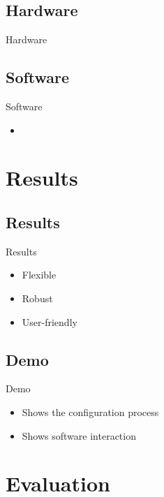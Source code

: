 \documentclass[t]{beamer}
\begin{document}
\subsection{Hardware}
\begin{frame}{Hardware}
  \begin{figure}[H]
    \centering
    \resizebox{\textwidth}{!}{%
      
    }
  \end{figure}
\end{frame}

\subsection{Software}
\begin{frame}{Software}
\begin{itemize}
  \item 
\end{itemize}
\end{frame}

\section{Results}
\subsection{Results}
\begin{frame}{Results}
\begin{itemize}
  \item Flexible
  \item Robust
  \item User-friendly
\end{itemize}
\end{frame}

\subsection{Demo}
\begin{frame}{Demo}
  \begin{itemize}
    \item Shows the configuration process
    \item Shows software interaction
  \end{itemize}
\end{frame}

\section{Evaluation}
\end{document}
